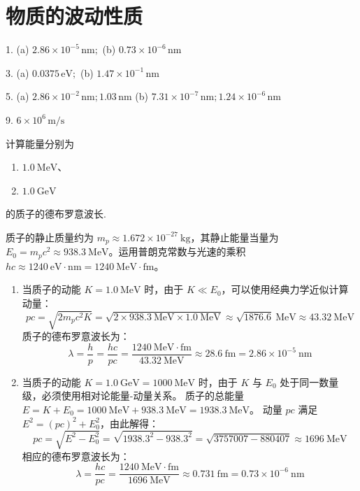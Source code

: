 \chapter{物质的波动性质}

\begin{oddanswers}
1. (a) $2.86 \times 10^{-5}\,\mathrm{nm};$ (b) $0.73 \times 10^{-6}\,\mathrm{nm}$

3. (a) $0.0375\,\mathrm{eV};$ (b) $1.47 \times 10^{-1}\,\mathrm{nm}$

5. (a) $2.86 \times 10^{-2}\,\mathrm{nm}; 1.03\,\mathrm{nm}$
(b) $7.31 \times 10^{-7}\,\mathrm{nm}; 1.24 \times 10^{-6}\,\mathrm{nm}$

9. $6 \times 10^6\,\mathrm{m/s}$
\end{oddanswers}

\begin{exercise}\label{ex:23.1}
计算能量分别为
\begin{enumerate}
  \item[(a)] $1.0 \ \mathrm{MeV}$、
  \item[(b)] $1.0 \ \mathrm{GeV}$
\end{enumerate}
的质子的德布罗意波长.
\end{exercise}
\begin{solution}
质子的静止质量约为 $m_p \approx 1.672 \times 10^{-27} \ \mathrm{kg}$，其静止能量当量为 $E_0 = m_p c^2 \approx 938.3 \ \mathrm{MeV}$。运用普朗克常数与光速的乘积 $hc \approx 1240 \ \mathrm{eV \cdot nm} = 1240 \ \mathrm{MeV \cdot fm}$。

\begin{enumerate}
    \item[(a)] 当质子的动能 $K = 1.0 \ \mathrm{MeV}$ 时，由于 $K \ll E_0$，可以使用经典力学近似计算动量：
    $$ pc = \sqrt{2 m_p c^2 K} = \sqrt{2 \times 938.3 \ \mathrm{MeV} \times 1.0 \ \mathrm{MeV}} \approx \sqrt{1876.6} \ \mathrm{MeV} \approx 43.32 \ \mathrm{MeV} $$
    质子的德布罗意波长为：
    $$ \lambda = \frac{h}{p} = \frac{hc}{pc} = \frac{1240 \ \mathrm{MeV \cdot fm}}{43.32 \ \mathrm{MeV}} \approx 28.6 \ \mathrm{fm} = 2.86 \times 10^{-5} \ \mathrm{nm} $$

    \item[(b)] 当质子的动能 $K = 1.0 \ \mathrm{GeV} = 1000 \ \mathrm{MeV}$ 时，由于 $K$ 与 $E_0$ 处于同一数量级，必须使用相对论能量-动量关系。
    质子的总能量 $E = K + E_0 = 1000 \ \mathrm{MeV} + 938.3 \ \mathrm{MeV} = 1938.3 \ \mathrm{MeV}$。
    动量 $pc$ 满足 $E^2 = (pc)^2 + E_0^2$，由此解得：
    $$ pc = \sqrt{E^2 - E_0^2} = \sqrt{1938.3^2 - 938.3^2} = \sqrt{3757007 - 880407} \approx 1696 \ \mathrm{MeV} $$
    相应的德布罗意波长为：
    $$ \lambda = \frac{hc}{pc} = \frac{1240 \ \mathrm{MeV \cdot fm}}{1696 \ \mathrm{MeV}} \approx 0.731 \ \mathrm{fm} = 0.73 \times 10^{-6} \ \mathrm{nm} $$
\end{enumerate}
\end{solution}

